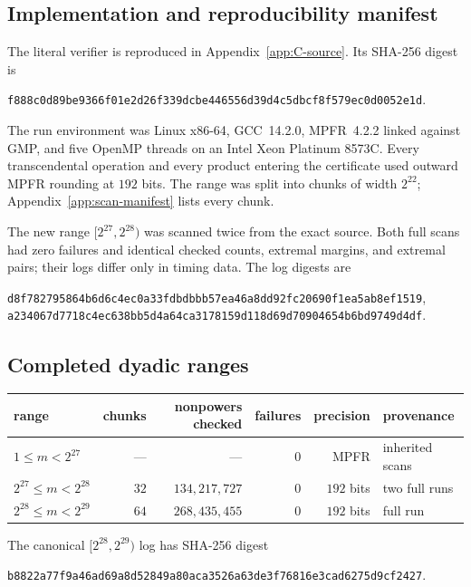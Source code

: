 \documentclass[11pt]{article}
\newcommand{\sha}[1]{\texttt{\footnotesize #1}}
\newcommand{\1}{\mathbf 1}
\theoremstyle{plain}
\theoremstyle{definition}
\theoremstyle{remark}
\begin{document}
\subsection{Implementation and reproducibility manifest}

The literal verifier is reproduced in Appendix~\ref{app:C-source}.  Its
SHA-256 digest is
\begin{center}
\sha{f888c0d89be9366f01e2d26f339dcbe446556d39d4c5dbcf8f579ec0d0052e1d}.
\end{center}
The run environment was Linux x86-64, GCC~14.2.0, MPFR~4.2.2 linked against
GMP, and five OpenMP threads on an Intel Xeon Platinum 8573C.  Every
transcendental operation and every product entering the certificate used
outward MPFR rounding at $192$ bits.  The range was split into chunks of width
$2^{22}$; Appendix~\ref{app:scan-manifest} lists every chunk.

The new range $[2^{27},2^{28})$ was scanned twice from the exact source.  Both
full scans had zero failures and identical checked counts, extremal margins,
and extremal pairs; their logs differ only in timing data.  The log digests
are
\begin{center}
\sha{d8f782795864b6d6c4ec0a33fdbdbbb57ea46a8dd92fc20690f1ea5ab8ef1519},\\
\sha{a234067d7718c4ec638bb5d4a64ca3178159d118d69d70904654b6bd9749d4df}.
\end{center}

\subsection{Completed dyadic ranges}

\begin{center}
\begin{tabular}{@{}lrrrrl@{}}
\toprule
range & chunks & nonpowers checked & failures & precision & provenance\\
\midrule
$1\le m<2^{27}$ & --- & --- & $0$ & MPFR & inherited scans\\
$2^{27}\le m<2^{28}$ & $32$ & $134{,}217{,}727$ & $0$ & $192$ bits & two full runs\\
$2^{28}\le m<2^{29}$ & $64$ & $268{,}435{,}455$ & $0$ & $192$ bits & full run\\
\bottomrule
\end{tabular}
\end{center}
The canonical $[2^{28},2^{29})$ log has SHA-256 digest
\begin{center}
\sha{b8822a77f9a46ad69a8d52849a80aca3526a63de3f76816e3cad6275d9cf2427}.
\end{center}
\end{document}
